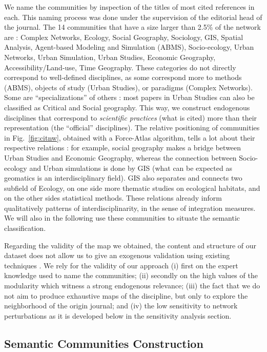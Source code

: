 We name the communities by inspection of the titles of most cited references in each. This naming process was done under the supervision of the editorial head of the journal. The 14 communities that have a size larger than 2.5\% of the network are : Complex Networks, Ecology, Social Geography, Sociology, GIS, Spatial Analysis, Agent-based Modeling and Simulation (ABMS), Socio-ecology, Urban Networks, Urban Simulation, Urban Studies, Economic Geography, Accessibility/Land-use, Time Geography. These categories do not directly correspond to well-defined disciplines, as some correspond more to methods (ABMS), objects of study (Urban Studies), or paradigms (Complex Networks). Some are ``specializations'' of others : most papers in Urban Studies can also be classified as Critical and Social geography. This way, we construct endogenous disciplines that correspond to \emph{scientific practices} (what is cited) more than their representation (the ``official'' disciplines). The relative positioning of communities in Fig.~\ref{fig:citnw}, obtained with a Force-Atlas algorithm, tells a lot about their respective relations : for example, social geography makes a bridge between Urban Studies and Economic Geography, whereas the connection between Socio-ecology and Urban simulations is done by GIS (what can be expected as geomatics is an interdisciplinary field). GIS also separates and connects two subfield of Ecology, on one side more thematic studies on ecological habitats, and on the other sides statistical methods. These relations already inform qualitatively patterns of interdisciplinarity, in the sense of integration measures. We will also in the following use these communities to situate the semantic classification.

Regarding the validity of the map we obtained, the content and structure of our dataset does not allow us to give an exogenous validation using existing techniques \cite{boyack2005mapping}. We rely for the validity of our approach (i) first on the expert knowledge used to name the communities; (ii) secondly on the high values of the modularity which witness a strong endogenous relevance; (iii) the fact that we do not aim to produce exhaustive maps of the discipline, but only to explore the neighborhood of the origin journal; and (iv) the low sensitivity to network perturbations as it is developed below in the sensitivity analysis section.



\subsection*{Semantic Communities Construction}

